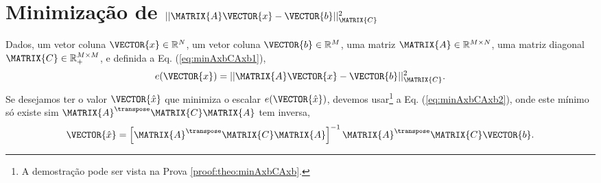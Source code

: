 \section{Minimização de $||\MATRIX{A}\VECTOR{x}-\VECTOR{b}||_{\MATRIX{C}}^2$}
\label{sec:minAxbCAxb}


\begin{theorem}\label{theo:minAxbCAxb}
Dados,
um vetor coluna $\VECTOR{x}\in \mathbb{R}^N$, 
um vetor coluna $\VECTOR{b}\in \mathbb{R}^M$,  
uma matriz $\MATRIX{A} \in \mathbb{R}^{M\times N}$, 
uma matriz diagonal $\MATRIX{C} \in \mathbb{R}^{M\times M}_{+}$, e 
definida a Eq. (\ref{eq:minAxbCAxb1}),
\begin{equation}\label{eq:minAxbCAxb1}
e(\VECTOR{x})  = ||\MATRIX{A}\VECTOR{x}-\VECTOR{b}||_{\MATRIX{C}}^2.
\end{equation}
Se desejamos ter o valor $\VECTOR{\hat{x}}$ que minimiza o escalar $e(\VECTOR{\hat{x}})$,
devemos usar\footnote{A demostração pode ser vista na Prova \ref{proof:theo:minAxbCAxb}.} a Eq. (\ref{eq:minAxbCAxb2}),
onde este mínimo só existe sim $\MATRIX{A}^{\transpose}\MATRIX{C} \MATRIX{A}$ tem inversa,
\begin{equation}\label{eq:minAxbCAxb2}
\VECTOR{\hat{x}} =
\left[ \MATRIX{A}^{\transpose}\MATRIX{C} \MATRIX{A} \right]^{-1}\MATRIX{A}^{\transpose}\MATRIX{C}\VECTOR{b}.
\end{equation}
\end{theorem}

